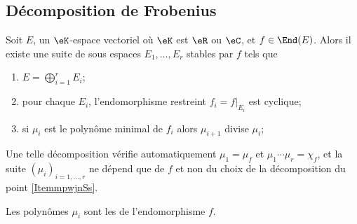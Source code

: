 \subsection{Décomposition de Frobenius}

\begin{theorem}
    Soit \( E\), un \( \eK\)-espace vectoriel où \( \eK\) est \( \eR\) ou \( \eC\), et \( f\in \End(E)\). Alors il existe une suite de sous espaces \( E_1,\ldots, E_r\) stables par \( f\) tels que
    \begin{enumerate}
        \item   \label{ItemmpwjnSs}
            \( E=\bigoplus_{i=1}^rE_i\);
        \item
            pour chaque \( E_i\), l'endomorphisme restreint \( f_i=f|_{E_i}\) est cyclique;
        \item
            si \( \mu_i\) est le polynôme minimal de \( f_i\) alors \( \mu_{i+1}\) divise \( \mu_i\);
    \end{enumerate}
    Une telle décomposition vérifie automatiquement \( \mu_1=\mu_f\) et \( \mu_1\cdots \mu_r=\chi_f\), et la suite \( (\mu_i)_{i=1,\ldots, r}\) ne dépend que de \( f\) et non du choix de la décomposition du point \ref{ItemmpwjnSs}.
\end{theorem}

Les polynômes \( \mu_i\) sont les  de l'endomorphisme \( f\).

